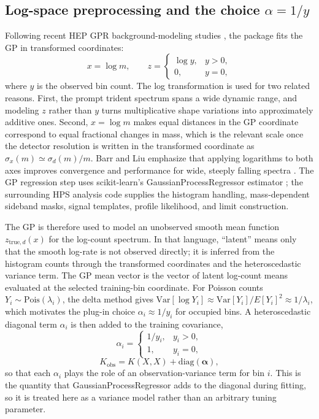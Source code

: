 \subsection{Log-space preprocessing and the choice \texorpdfstring{$\alpha=1/y$}{alpha=1/y}}

Following recent HEP GPR background-modeling studies
\cite{BarrLiu2025,Gandrakota2023}, the package fits the GP in transformed coordinates:
\begin{equation}
x = \log m,
\qquad
z =
\begin{cases}
\log y, & y>0, \\
0, & y=0,
\end{cases}
\end{equation}
where $y$ is the observed bin count. The log transformation is used for two related
reasons. First, the prompt trident spectrum spans a wide dynamic range, and modeling
$z$ rather than $y$ turns multiplicative shape variations into approximately additive
ones. Second, $x=\log m$ makes equal distances in the GP coordinate correspond to equal
fractional changes in mass, which is the relevant scale once the detector resolution is
written in the transformed coordinate as $\sigma_x(m)\simeq \sigma_d(m)/m$. Barr and
Liu emphasize that applying logarithms to both axes improves convergence and
performance for wide, steeply falling spectra \cite{BarrLiu2025}.
The GP regression step uses scikit-learn's GaussianProcessRegressor estimator
\cite{ScikitLearn}; the surrounding HPS analysis code supplies the histogram
handling, mass-dependent sideband masks, signal templates, profile likelihood,
and \CLs{} limit construction.

The GP is therefore used to model an unobserved smooth mean function
$z_{\mathrm{true},d}(x)$ for the log-count spectrum. In that language, ``latent'' means
only that the smooth log-rate is not observed directly; it is inferred from the
histogram counts through the transformed coordinates and the heteroscedastic variance
term. The GP mean vector is the vector of latent log-count means evaluated at the
selected training-bin coordinate. For Poisson counts $Y_i \sim
\mathrm{Pois}(\lambda_i)$, the delta method gives
$\mathrm{Var}[\log Y_i]\approx \mathrm{Var}[Y_i]/E[Y_i]^2 \approx 1/\lambda_i$, which
motivates the plug-in choice $\alpha_i\approx 1/y_i$ for occupied bins. A
heteroscedastic diagonal term $\alpha_i$ is then added to the training covariance,
\begin{equation}
\alpha_i =
\begin{cases}
1/y_i, & y_i > 0, \\
1, & y_i = 0,
\end{cases}
\label{eq:alpha-oney}
\end{equation}
\begin{equation}
K_{\mathrm{obs}} = K(X,X) + \mathrm{diag}(\bm{\alpha}),
\end{equation}
so that each $\alpha_i$ plays the role of an observation-variance term for bin $i$.
This is the quantity that GaussianProcessRegressor adds to the diagonal during fitting,
so it is treated here as a variance model rather than an arbitrary tuning parameter.


